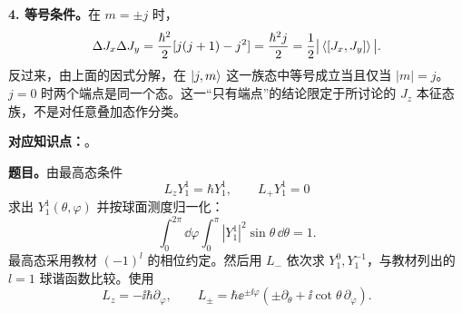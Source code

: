 \begin{checkedsolution}
\textbf{4. 等号条件。}在 $m=\pm j$ 时，
\begin{equation}
  \Delta J_x\Delta J_y
   =\frac{\hbar^2}{2}[j(j+1)-j^2]
   =\frac{\hbar^2j}{2}
   =\frac12\big|\left\langle [J_x,J_y] \right\rangle\big|.
\end{equation}
反过来，由上面的因式分解，在 $\left|j,m\right\rangle$ 这一族态中等号成立当且仅当 $|m|=j$。$j=0$ 时两个端点是同一个态。这一“只有端点”的结论限定于所讨论的 $J_z$ 本征态族，不是对任意叠加态作分类。
\end{checkedsolution}

\textbf{对应知识点：}。

\textbf{题目。}由最高态条件
\begin{equation}
  L_zY_1^1=\hbar Y_1^1,\qquad L_+Y_1^1=0
\end{equation}
求出 $Y_1^1(\theta,\varphi)$ 并按球面测度归一化：
\begin{equation}
  \int_0^{2\pi}\dd\varphi\int_0^\pi
    |Y_1^1|^2\sin\theta\,\dd\theta=1.
\end{equation}
最高态采用教材 $(-1)^l$ 的相位约定。然后用 $L_-$ 依次求 $Y_1^0,Y_1^{-1}$，与教材列出的 $l=1$ 球谐函数比较。使用
\begin{equation}
  L_z=-\ii\hbar\partial_\varphi,\qquad
  L_\pm=\hbar\ee^{\pm\ii\varphi}
      (\pm\partial_\theta+\ii\cot\theta\,\partial_\varphi).
\end{equation}

